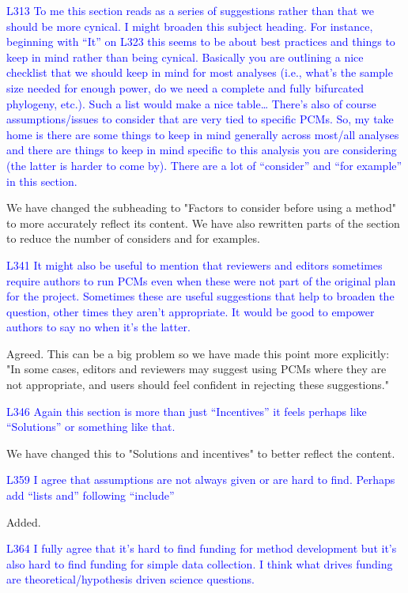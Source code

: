 \documentclass[12pt]{letter}
\begin{document}
\begin{letter}{}
\textcolor{blue}{L313 To me this section reads as a series of suggestions rather than that we should be more cynical. I might broaden this subject heading. For instance, beginning with “It” on L323 this seems to be about best practices and things to keep in mind rather than being cynical. Basically you are outlining a nice checklist that we should keep in mind for most analyses (i.e., what's the sample size needed for enough power, do we need a complete and fully bifurcated phylogeny, etc.). Such a list would make a nice table… There's also of course assumptions/issues to consider that are very tied to specific PCMs. So, my take home is there are some things to keep in mind generally across most/all analyses and there are things to keep in mind specific to this analysis you are considering (the latter is harder to come by). There are a lot of “consider” and “for example” in this section.}

We have changed the subheading to "Factors to consider before using a method" to more accurately reflect its content. We have also rewritten parts of the section to reduce the number of considers and for examples. 

\textcolor{blue}{L341 It might also be useful to mention that reviewers and editors sometimes require authors to run PCMs even when these were not part of the original plan for the project. Sometimes these are useful suggestions that help to broaden the question, other times they aren't appropriate. It would be good to empower authors to say no when it's the latter.}

Agreed. This can be a big problem so we have made this point more explicitly: "In some cases, editors and reviewers may suggest using PCMs where they are not appropriate, and users should feel confident in rejecting these suggestions."

\textcolor{blue}{L346 Again this section is more than just “Incentives” it feels perhaps like “Solutions” or something like that.}

We have changed this to "Solutions and incentives" to better reflect the content.

\textcolor{blue}{L359 I agree that assumptions are not always given or are hard to find. Perhaps add “lists and” following “include”}

Added.

\textcolor{blue}{L364 I fully agree that it's hard to find funding for method development but it's also hard to find funding for simple data collection. I think what drives funding are theoretical/hypothesis driven science questions.}


\end{letter}
\end{document}
